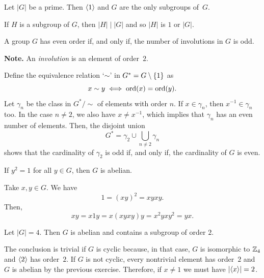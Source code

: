 \begin{exr}
    Let\/ $|G|$ be a prime. Then\/ $\langle1\rangle$ and\/ $G$ are the only subgroups of\/~$G$.
\end{exr}

\begin{solution} If $H$ is a subgroup of $G$, then $|H|\mid|G|$ and so $|H|$ is $1$ or $|G|$.  \end{solution}

\begin{exr}\label{exercise-1.1.7}
    A group\/ $G$ has even order if, and only if, the number of involutions in\/ $G$ is odd.

    \textrm{\upshape\textbf{Note.} An \textsl{involution\/} is an element of order~$2$.}
\end{exr}

\begin{solution} Define the equivalence relation `$\sim$' in $G^*=G\setminus\{1\}$ as
$$
    x\sim y\iff{\rm ord}(x)={\rm ord}(y).
$$
Let $\gamma_n$ be the class in $G^*\!/{\sim}$ of elements with order $n$. If $x\in\gamma_n$, then $x^{-1}\in\gamma_n$ too. In the case $n\ne2$, we also have $x\ne x^{-1}$, which implies that $\gamma_n$ has an even number of elements. Then, the disjoint union
$$
    G^* = \gamma_2\cup\bigcup_{n\ne2}\gamma_n
$$
shows that the cardinality of $\gamma_2$ is odd if, and only if, the cardinality of $G$ is even.  \end{solution}

\begin{exr}
    If\/ $y^2=1$ for all\/ $y\in G$, then\/ $G$ is abelian.
\end{exr}

\begin{solution} Take $x,y\in G$. We have
$$
    1 = (xy)^2 = xyxy.
$$
Then,
$$
    xy = x1y = x(xyxy)y = x^2yxy^2 = yx.
$$
 \end{solution}

\begin{exr}
    Let\/ $|G|=4$. Then\/ $G$ is abelian and contains a subgroup of order\/ $2$.
\end{exr}

\begin{solution} The conclusion is trivial if $G$ is cyclic because, in that case, $G$ is isomorphic to $\mathbb{Z}_4$ and $\langle2\rangle$ has order~$2$. If $G$ is not cyclic, every nontrivial element has order~$2$ and $G$ is abelian by the previous exercise. Therefore, if $x\ne1$ we must have $|\langle x\rangle|=2$.  \end{solution}

